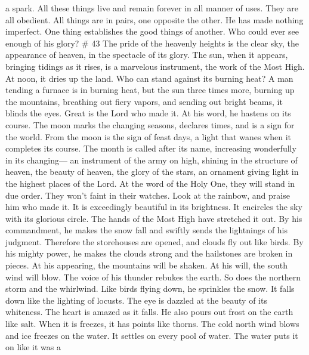 a spark.  All these things live and remain forever in all
manner of uses. They are all obedient.  All things are in
pairs, one opposite the other. He has made nothing imperfect.
 One thing establishes the good things of another. Who
could ever see enough of his glory? \# 43  The pride of the
heavenly heights is the clear sky, the appearance of heaven, in the
spectacle of its glory.  The sun, when it appears, bringing
tidings as it rises, is a marvelous instrument, the work of the Most
High.  At noon, it dries up the land. Who can stand against
its burning heat?  A man tending a furnace is in burning
heat, but the sun three times more, burning up the mountains, breathing
out fiery vapors, and sending out bright beams, it blinds the eyes.
 Great is the Lord who made it. At his word, he hastens on
its course.  The moon marks the changing seasons, declares
times, and is a sign for the world.  From the moon is the
sign of feast days, a light that wanes when it completes its course.
 The month is called after its name, increasing wonderfully
in its changing--- an instrument of the army on high, shining in the
structure of heaven,  the beauty of heaven, the glory of the
stars, an ornament giving light in the highest places of the Lord.
 At the word of the Holy One, they will stand in due order.
They won't faint in their watches.  Look at the rainbow,
and praise him who made it. It is exceedingly beautiful in its
brightness.  It encircles the sky with its glorious circle.
The hands of the Most High have stretched it out.  By his
commandment, he makes the snow fall and swiftly sends the lightnings of
his judgment.  Therefore the storehouses are opened, and
clouds fly out like birds.  By his mighty power, he makes
the clouds strong and the hailstones are broken in pieces. 
At his appearing, the mountains will be shaken. At his will, the south
wind will blow.  The voice of his thunder rebukes the
earth. So does the northern storm and the whirlwind. Like birds flying
down, he sprinkles the snow. It falls down like the lighting of locusts.
 The eye is dazzled at the beauty of its whiteness. The
heart is amazed as it falls.  He also pours out frost on
the earth like salt. When it is freezes, it has points like thorns.
 The cold north wind blows and ice freezes on the water. It
settles on every pool of water. The water puts it on like it was a
